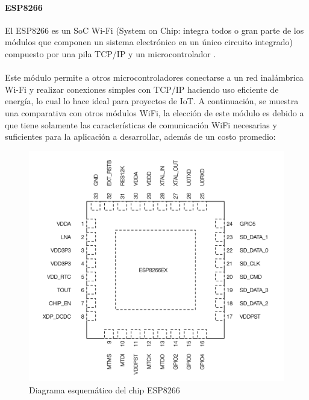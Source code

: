 \paragraph{ESP8266}
El ESP8266 es un SoC Wi-Fi \citep{MarcoTeorico7} (System on Chip: integra todos o gran parte de los módulos que componen un sistema electrónico en un único circuito integrado) compuesto por una pila TCP/IP y un microcontrolador \citep{MarcoTeorico8}.
\paragraph{}

Este módulo permite a otros microcontroladores conectarse a un red inalámbrica Wi-Fi y realizar conexiones simples con TCP/IP haciendo uso eficiente de energía, lo cual lo hace ideal para proyectos de IoT. A continuación, se muestra una comparativa con otros módulos WiFi, la elección de este módulo es debido a que tiene solamente las características de comunicación WiFi necesarias y suficientes para la aplicación a desarrollar, además de un costo promedio:

\begin{figure}[H]
	\centering
	\includegraphics[scale=.4]{Capitulo2/images/esp8266.png}
	\caption{Diagrama esquemático del chip ESP8266}
	\label{fig:diagrama_dispensador}
\end{figure}

\pagebreak

